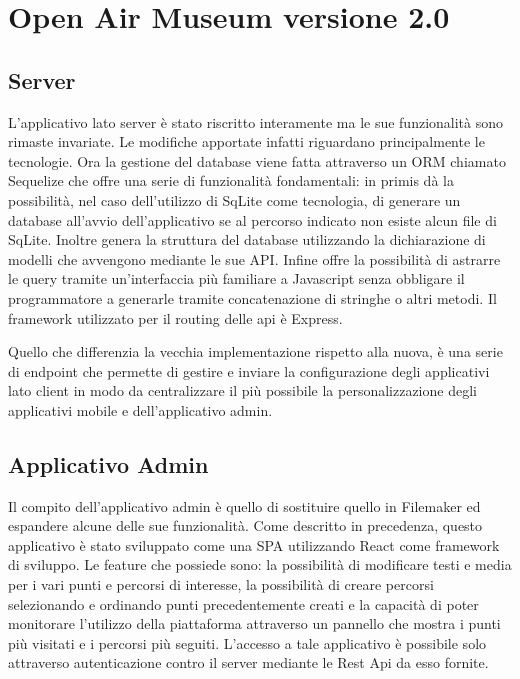 \chapter{Open Air Museum versione 2.0}
\vspace{5mm}

\section{Server}\vspace{5mm}

L'applicativo lato server è stato riscritto interamente ma le sue funzionalità  sono rimaste invariate. Le modifiche apportate infatti riguardano principalmente le tecnologie. Ora la gestione del database viene fatta attraverso un ORM chiamato Sequelize che offre una serie di funzionalità fondamentali: in primis dà la possibilità, nel caso dell'utilizzo di SqLite come tecnologia, di generare un database all'avvio dell'applicativo se al percorso indicato non esiste alcun file di SqLite. Inoltre genera la struttura del database utilizzando la dichiarazione di modelli che avvengono mediante le sue API. Infine offre la possibilità di astrarre le query tramite un'interfaccia più familiare a Javascript senza obbligare il programmatore a generarle tramite concatenazione di stringhe o altri metodi. Il framework utilizzato per il routing delle api è Express.\vspace{5mm}

Quello che differenzia la vecchia implementazione rispetto alla nuova, è una serie di endpoint che permette di gestire e inviare la configurazione degli applicativi lato client in modo da centralizzare il più possibile la personalizzazione degli applicativi mobile e dell'applicativo admin.  

\section{Applicativo Admin}\vspace{5mm}

Il compito dell'applicativo admin è quello di sostituire quello in Filemaker ed espandere alcune delle sue funzionalità. Come descritto in precedenza, questo applicativo è stato sviluppato come una SPA utilizzando React come framework di sviluppo. Le feature che possiede sono: la possibilità di modificare testi e media per i vari punti e percorsi di interesse, la possibilità di creare percorsi selezionando e ordinando punti precedentemente creati e la capacità di poter monitorare l'utilizzo della piattaforma attraverso un pannello che mostra i punti più visitati e i percorsi più seguiti. L'accesso a tale applicativo è possibile solo attraverso autenticazione contro il server mediante le Rest Api da esso fornite.\vspace{5mm}

